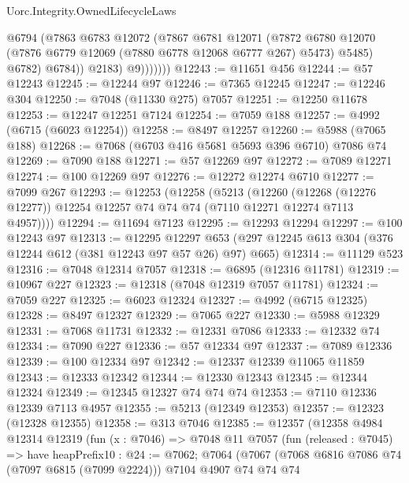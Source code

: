 \begin{lexlean}{Uorc.Integrity.OwnedLifecycleLaws}
\begin{coremodule}
                      @6794
                      (@7863
                        @6783
                        @12072
                        (@7867
                          @6781
                          @12071
                          (@7872
                            @6780
                            @12070
                            (@7876 @6779 @12069 (@7880 @6778 @12068 @6777 @267) @5473)
                            @5485)
                          @6782)
                        @6784))
                    @2183)
                  @9)))))))
@12243 := @11651 @456
@12244 := @57 @12243
@12245 := @12244 @97
@12246 := @7365 @12245
@12247 := @12246 @304
@12250 := @7048 (@11330 @275) @7057
@12251 := @12250 @11678
@12253 := @12247 @12251 @7124
@12254 := @7059 @188
@12257 := @4992 (@6715 (@6023 @12254))
@12258 := @8497 @12257
@12260 := @5988 (@7065 @188)
@12268 := @7068 (@6703 @416 @5681 @5693 @396 @6710) @7086 @74
@12269 := @7090 @188
@12271 := @57 @12269 @97
@12272 := @7089 @12271
@12274 := @100 @12269 @97
@12276 := @12272 @12274 @6710
@12277 := @7099 @267
@12293 := @12253
    (@12258
      (@5213
        (@12260
          (@12268 (@12276 @12277))
          @12254
          @12257
          @74
          @74
          @74
          (@7110 @12271 @12274 @7113 @4957))))
@12294 := @11694 @7123
@12295 := @12293 @12294
@12297 := @100 @12243 @97
@12313 := @12295
    @12297
    @653
    (@297 @12245 @613 @304 (@376 @12244 @612 (@381 @12243 @97 @57 @26) @97) @665)
@12314 := @11129 @523
@12316 := @7048 @12314 @7057
@12318 := @6895 (@12316 @11781)
@12319 := @10967 @227
@12323 := @12318 (@7048 @12319 @7057 @11781)
@12324 := @7059 @227
@12325 := @6023 @12324
@12327 := @4992 (@6715 @12325)
@12328 := @8497 @12327
@12329 := @7065 @227
@12330 := @5988 @12329
@12331 := @7068 @11731
@12332 := @12331 @7086
@12333 := @12332 @74
@12334 := @7090 @227
@12336 := @57 @12334 @97
@12337 := @7089 @12336
@12339 := @100 @12334 @97
@12342 := @12337 @12339 @11065 @11859
@12343 := @12333 @12342
@12344 := @12330 @12343
@12345 := @12344 @12324
@12349 := @12345 @12327 @74 @74 @74
@12353 := @7110 @12336 @12339 @7113 @4957
@12355 := @5213 (@12349 @12353)
@12357 := @12323 (@12328 @12355)
@12358 := @313 @7046
@12385 := @12357
    (@12358
      @4984
      @12314
      @12319
      (fun (x : @7046) =>
      @7048
        @11
        @7057
        (fun (released : @7045) =>
        have heapPrefix10 : @24 := @7062;
        @7064
          (@7067
            (@7068 @6816 @7086 @74 (@7097 @6815 (@7099 @2224)))
            @7104
            @4907
            @74
            @74
            @74

\end{coremodule}
\end{lexlean}
